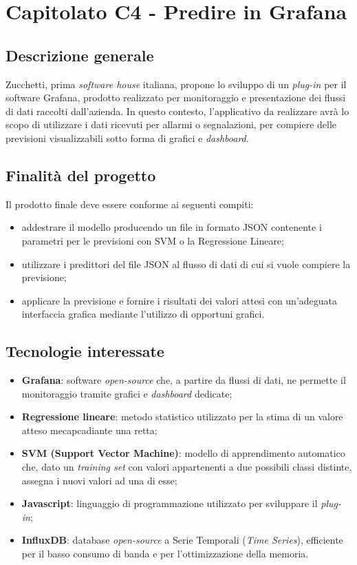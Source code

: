 \section{Capitolato C4 - Predire in Grafana}

\subsection{Descrizione generale}
Zucchetti, prima \textit{software house\glo} italiana, propone lo sviluppo di un \textit{plug-in\glo} per il software Grafana, prodotto realizzato per monitoraggio e presentazione dei flussi di dati raccolti dall'azienda. In questo contesto, l'applicativo da realizzare avrà lo scopo di utilizzare i dati ricevuti per allarmi o segnalazioni, per compiere delle previsioni visualizzabili sotto forma di grafici e \textit{dashboard\glos}.

\subsection{Finalità del progetto}
Il prodotto finale deve essere conforme ai seguenti compiti:
\begin{itemize}
	\item addestrare il modello producendo un file in formato JSON contenente i parametri per le previsioni con SVM o la Regressione Lineare;
	\item utilizzare i predittori del file JSON al flusso di dati di cui si vuole compiere la previsione;
	\item applicare la previsione e fornire i risultati dei valori attesi con un'adeguata interfaccia grafica mediante l'utilizzo di opportuni grafici.
\end{itemize}

\subsection{Tecnologie interessate}
\begin{itemize}
	\item \textbf{Grafana}: software \textit{open-source\glo} che, a partire da flussi di dati, ne permette il monitoraggio tramite grafici e \textit{dashboard\glo} dedicate;
	\item \textbf{Regressione lineare}: metodo statistico utilizzato per la stima di un valore atteso mecapcadiante una retta;
	\item \textbf{SVM (Support Vector Machine)}:  modello di apprendimento automatico che, dato un \textit{training set\glo} con valori appartenenti a due possibili classi distinte, assegna i nuovi valori ad una di esse;
	\item \textbf{Javascript}: linguaggio di programmazione utilizzato per sviluppare il \textit{plug-in\glos};
	\item \textbf{InfluxDB}: database \textit{open-source\glo} a Serie Temporali (\textit{Time Series\glos}), efficiente per il basso consumo di banda e per l'ottimizzazione della memoria.
\end{itemize}

